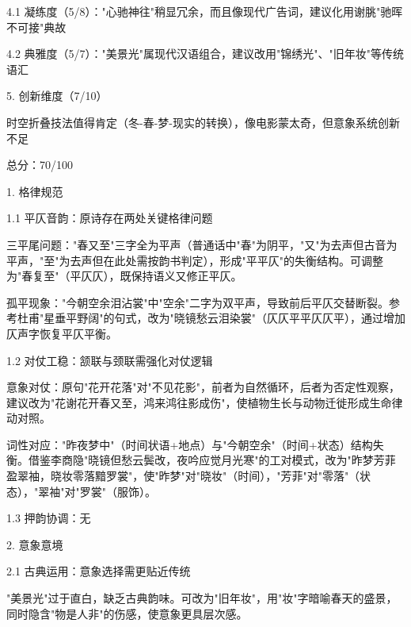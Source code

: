 \begin{tcolorbox}[
    breakable,            %
    colback=white, %
    colframe=black, 
    boxrule=1pt,        %
    arc=0mm             %
    ]
    \hspace{2em}4.1 凝练度（5/8）："心驰神往"稍显冗余，而且像现代广告词，建议化用谢朓"驰晖不可接"典故\par
    \hspace{2em}4.2 典雅度（5/7）："美景光"属现代汉语组合，建议改用"锦绣光"、"旧年妆"等传统语汇\par
    5. 创新维度（7/10）\par
    \hspace{2em}时空折叠技法值得肯定（冬-春-梦-现实的转换），像电影蒙太奇，但意象系统创新不足\par
    总分：70/100\par\par
    [改进建议]\par
    1. 格律规范\par
    \hspace{2em}1.1 平仄音韵：原诗存在两处关键格律问题\par
    \hspace{2em}三平尾问题："春又至"三字全为平声（普通话中"春"为阴平，"又"为去声但古音为平声，"至"为去声但在此处需按韵书判定），形成"平平仄"的失衡结构。可调整为"春复至"（平仄仄），既保持语义又修正平仄。\par
    \hspace{2em}孤平现象："今朝空余泪沾裳"中"空余"二字为双平声，导致前后平仄交替断裂。参考杜甫"星垂平野阔"的句式，改为"晓镜愁云泪染裳"（仄仄平平仄仄平），通过增加仄声字恢复平仄平衡。\par
    \hspace{2em} 1.2 对仗工稳：颔联与颈联需强化对仗逻辑\par
    \hspace{2em}意象对仗：原句"花开花落"对"不见花影"，前者为自然循环，后者为否定性观察，建议改为"花谢花开春又至，鸿来鸿往影成伤"，使植物生长与动物迁徙形成生命律动对照。\par
    \hspace{2em}词性对应："昨夜梦中"（时间状语+地点）与"今朝空余"（时间+状态）结构失衡。借鉴李商隐"晓镜但愁云鬓改，夜吟应觉月光寒"的工对模式，改为"昨梦芳菲盈翠袖，晓妆零落黯罗裳"，使"昨梦"对"晓妆"（时间），"芳菲"对"零落"（状态），"翠袖"对"罗裳"（服饰）。\par
    \hspace{2em}1.3 押韵协调：无\par
    2. 意象意境\par
    \hspace{2em}2.1 古典运用：意象选择需更贴近传统\par
    \hspace{2em}"美景光"过于直白，缺乏古典韵味。可改为"旧年妆"，用"妆"字暗喻春天的盛景，同时隐含"物是人非"的伤感，使意象更具层次感。\par

\end{tcolorbox}
